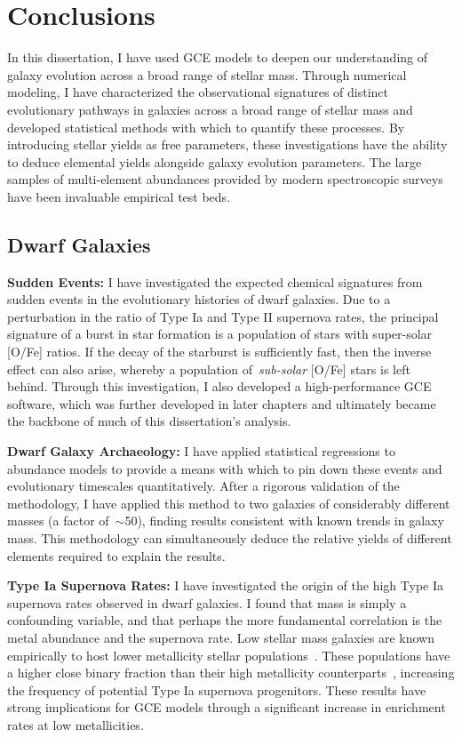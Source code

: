 \documentclass[main.tex]{subfiles}
\begin{document}
\chapter{Conclusions}
\label{conclusions}

In this dissertation, I have used GCE models to deepen our understanding of
galaxy evolution across a broad range of stellar mass.
Through numerical modeling, I have characterized the observational
signatures of distinct evolutionary pathways in galaxies across a broad range
of stellar mass and developed statistical methods with which to quantify these
processes.
By introducing stellar yields as free parameters, these investigations have
the ability to deduce elemental yields alongside galaxy evolution parameters.
The large samples of multi-element abundances provided by modern spectroscopic
surveys have been invaluable empirical test beds.

\section{Dwarf Galaxies}
\label{conclusions:sec:dwarfs}
\textbf{Sudden Events:} I have investigated the expected chemical signatures
from sudden events in the evolutionary histories of dwarf galaxies.
Due to a perturbation in the ratio of Type Ia and Type II supernova rates,
the principal signature of a burst in star formation is a population of
stars with super-solar [O/Fe] ratios.
If the decay of the starburst is sufficiently fast, then the inverse effect can
also arise, whereby a population of~\textit{sub-solar} [O/Fe] stars is left
behind.
Through this investigation, I also developed a high-performance GCE software,
which was further developed in later chapters and ultimately became the
backbone of much of this dissertation's analysis.
\par
\textbf{Dwarf Galaxy Archaeology:} I have applied statistical regressions to
abundance models to provide a means with which to pin down these events and
evolutionary timescales quantitatively.
After a rigorous validation of the methodology, I have applied this method to
two galaxies of considerably different masses (a factor of~$\sim$50), finding
results consistent with known trends in galaxy mass.
This methodology can simultaneously deduce the relative yields of different
elements required to explain the results.
\par
\textbf{Type Ia Supernova Rates:} I have investigated the origin of the high
Type Ia supernova rates observed in dwarf galaxies.
I found that mass is simply a confounding variable, and that perhaps the more
fundamental correlation is the metal abundance and the supernova rate.
Low stellar mass galaxies are known empirically to host lower metallicity
stellar populations~\citep[e.g.,][]{Gallazzi2005, Kirby2013}.
These populations have a higher close binary fraction than their high
metallicity counterparts~\citep[e.g.,][]{Badenes2018, Moe2019}, increasing the
frequency of potential Type Ia supernova progenitors.
These results have strong implications for GCE models through a significant
increase in enrichment rates at low metallicities.
\end{document}

